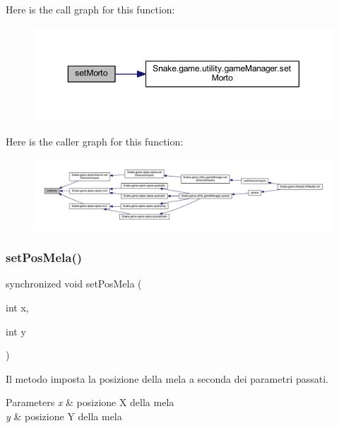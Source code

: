 Here is the call graph for this function\+:
\nopagebreak
\begin{figure}[H]
\begin{center}
\leavevmode
\includegraphics[width=350pt]{class_snake_1_1game_1_1gioco_a118b98e3108dd550bb66d06db01eac41_cgraph}
\end{center}
\end{figure}
Here is the caller graph for this function\+:
\nopagebreak
\begin{figure}[H]
\begin{center}
\leavevmode
\includegraphics[width=350pt]{class_snake_1_1game_1_1gioco_a118b98e3108dd550bb66d06db01eac41_icgraph}
\end{center}
\end{figure}
\mbox{\label{class_snake_1_1game_1_1gioco_a6fcd26707b59561887560c3c4696062b}} 
\subsubsection{\texorpdfstring{set\+Pos\+Mela()}{setPosMela()}}
{\footnotesize\ttfamily synchronized void set\+Pos\+Mela (\begin{DoxyParamCaption}\item[{int}]{x,  }\item[{int}]{y }\end{DoxyParamCaption})}



Il metodo imposta la posizione della mela a seconda dei parametri passati. 


\begin{DoxyParams}{Parameters}
{\em x} & posizione X della mela \\
\hline
{\em y} & posizione Y della mela \\
\hline
\end{DoxyParams}


